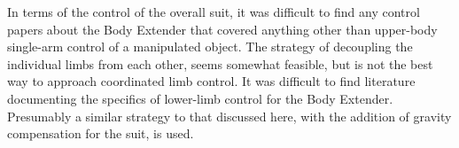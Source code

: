 In terms of the control of the overall suit, it was difficult to find any control papers about the Body Extender that covered anything other than upper-body single-arm control of a manipulated object.  The strategy of decoupling the individual limbs from each other, seems somewhat feasible, but is not the best way to approach coordinated limb control.  It was difficult to find literature documenting the specifics of lower-limb control for the Body Extender.  Presumably a similar strategy to that discussed here, with the addition of gravity compensation for the suit, is used.
  
% 








